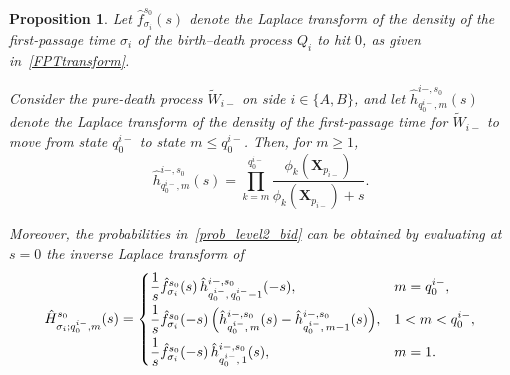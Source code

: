 \documentclass[11pt]{article}
\newtheorem{proposition}{Proposition}
\begin{document}
\begin{proposition}\label{prop_3_level2}
Let $\hat{f}_{\sigma_i}^{s_0}(s)$ denote the Laplace transform of the density of the first-passage time $\sigma_i$ of the birth--death process $Q_i$ to hit $0$, as given in~\eqref{FPTtransform}. 

Consider the pure-death process $\tilde{W}_{i-}$ on side $i\in\{A,B\}$, and let $\hat{h}_{q_0^{i-},m}^{i-,s_0}(s)$ denote the Laplace transform of the density of the first-passage time for $\tilde{W}_{i-}$ to move from state $q_0^{i-}$ to state $m\leq q_0^{i-}$. Then, for $m\geq 1$,
\begin{equation}
\hat{h}_{q_0^{i-},m}^{i-,s_0}(s)
=
\prod_{k=m}^{q_0^{i-}}
\frac{\phi_k(\boldsymbol{X}_{p_{i-}})}
{\phi_k(\boldsymbol{X}_{p_{i-}})+s}.
\end{equation}

Moreover, the probabilities in~\eqref{prob_level2_bid} can be obtained by evaluating at $s=0$ the inverse Laplace transform of
\begin{equation}
\hat{H}^{s_0}_{\sigma_i; q_0^{i-}, m}(s)=
\begin{cases}
\dfrac{1}{s}\hat{f}^{s_0}_{\sigma_i}(s)\,
\hat{h}^{i-, s_0}_{q_0^{i-},\,q_0^{i-}-1}(-s),
& m=q_0^{i-}, \\[0.6em]
\dfrac{1}{s}\hat{f}^{s_0}_{\sigma_i}(-s)\,
\Bigl(\hat{h}^{i-, s_0}_{q_0^{i-},\,m}(s)
-\hat{h}^{i-, s_0}_{q_0^{i-},\,m-1}(s)\Bigr),
& 1<m<q_0^{i-}, \\[0.6em]
\dfrac{1}{s}\hat{f}^{s_0}_{\sigma_i}(-s)\,
\hat{h}^{i-, s_0}_{q_0^{i-},\,1}(s),
& m=1.
\end{cases}
\end{equation}
\end{proposition}
\end{document}

